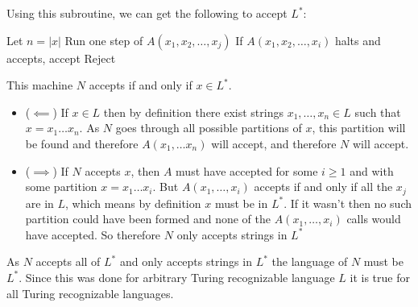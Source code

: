 \documentclass[english]{article}
\begin{document}
Using this subroutine, we can get the following to accept $L^*$:
\begin{algorithmic}
\State Let $n = |x|$
			\State Run one step of $A(x_1,x_2,\ldots,x_j)$
			\State If $A(x_1,x_2,\ldots,x_i)$ halts and accepts, accept
		\EndFor
	\EndFor
\EndFor
\State Reject
\EndFunction 
\end{algorithmic}

This machine $N$ accepts if and only if $x \in L^*$. 
\begin{itemize}
\item ($ \impliedby $) If $x \in L$ then by definition there exist strings
	$x_1, \ldots, x_n \in L$ such that $x = x_1 \ldots x_n$. As $N$
	goes through all possible partitions of $x$, this partition will be
	found and therefore $A(x_1,\ldots x_n)$ will accept, and therefore
	$N$ will accept.
\item ($ \implies $) If $N$ accepts $x$, then $A$ must have accepted
	for some $i \ge 1$ and with some partition $x = x_1 \ldots x_i$.
	But $A(x_1, \ldots, x_i)$ accepts if and only if all the $x_j$ are
	in $L$, which means by definition $x$ must be in $L^*$. If it wasn't
	then no such partition could have been formed and none of the 
	$A(x_1,\ldots,x_i)$ calls would have accepted. So therefore $N$ only
	accepts strings in $L^*$
\end{itemize}

As $N$ accepts all of $L^*$ and only accepts strings in $L^*$ the language
of $N$ must be $L^*$. Since this was done for arbitrary Turing recognizable
language $L$ it is true for all Turing recognizable languages.
\end{document}

